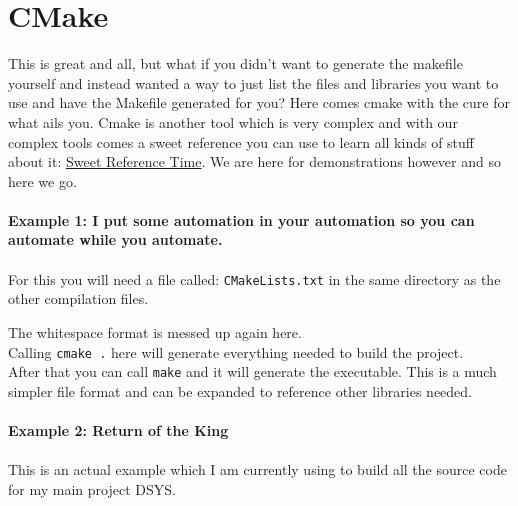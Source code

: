 \documentclass[12pt]{extarticle}
\theoremstyle{plain}
\theoremstyle{plain}
\theoremstyle{plain}
\theoremstyle{Definition}
\theoremstyle{Definition}
\theoremstyle{plain}
\theoremstyle{plain}
\begin{document}
	\section{CMake}
		This is great and all, but what if you didn't want to generate the makefile yourself and instead wanted a way to just list the files and libraries you want to use and have the Makefile generated for you? Here comes cmake with the cure for what ails you. Cmake is another tool which is very complex and with our complex tools comes a sweet reference you can use to learn all kinds of stuff about it: \href{https://cmake.org/documentation/}{Sweet Reference Time}. 
		We are here for demonstrations however and so here we go. \\ \\
		\textbf{Example 1: I put some automation in your automation so you can automate while you automate.} \\ \\
		For this you will need a file called: \verb|CMakeLists.txt| in the same directory as the other compilation files. 
		
		The whitespace format is messed up again here. \\
		Calling \verb|cmake .| here will generate everything needed to build the project. \\ 
		After that you can call \verb|make| and it will generate the executable. 
		This is a much simpler file format and can be expanded to reference other libraries needed. \\ \\
		\textbf{Example 2: Return of the King} \\ \\
		This is an actual example which I am currently using to build all the source code for my main project DSYS. 
		
\end{document}
